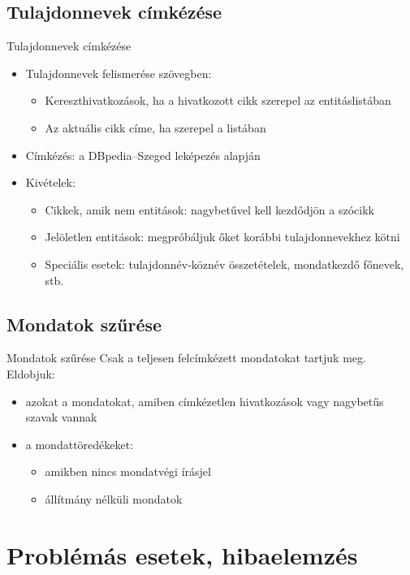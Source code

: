 \documentclass[utf8x,t]{beamer}
\newcommand{\vitem}{\item \vspace{4pt}}
\begin{document}
\subsection{Tulajdonnevek címkézése}
\begin{frame}{Tulajdonnevek címkézése}
  \bigskip
  \begin{itemize}
  \vitem Tulajdonnevek felismerése szövegben:
    \begin{itemize}
    \vitem Kereszthivatkozások, ha a hivatkozott cikk szerepel az entitáslistában
    \vitem Az aktuális cikk címe, ha szerepel a listában
    \end{itemize}
  \vitem Címkézés: a DBpedia--Szeged leképezés alapján
  \vitem Kivételek:
    \begin{itemize}
    \vitem Cikkek, amik nem entitások: nagybetűvel kell kezdődjön a szócikk
    \vitem Jelöletlen entitások: megpróbáljuk őket korábbi tulajdonnevekhez kötni
    \vitem Speciális esetek: tulajdonnév-köznév összetételek, mondatkezdő főnevek, stb.
    \end{itemize}
  \end{itemize}
\end{frame}

\subsection{Mondatok szűrése}
\begin{frame}{Mondatok szűrése}
  \bigskip
  Csak a teljesen felcímkézett mondatokat tartjuk meg. Eldobjuk:
  \smallskip
  \begin{itemize}
  \vitem azokat a mondatokat, amiben címkézetlen hivatkozások vagy nagybetűs szavak vannak
  \vitem a mondattöredékeket:
    \begin{itemize}
    \vitem amikben nincs mondatvégi írásjel %
    \vitem állítmány nélküli mondatok %
    \end{itemize}
  \end{itemize}
\end{frame}

\section{Problémás esetek, hibaelemzés}
\end{document}
